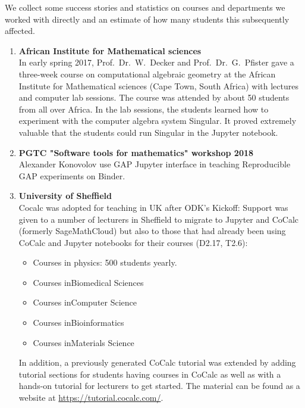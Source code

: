 We collect some success stories and statistics on courses and
departments we worked with directly and an estimate of how many
students this subsequently affected.

\begin{enumerate}
\item \textbf{African Institute for Mathematical sciences}\\
  In early spring 2017, Prof.~Dr.~W.~Decker and Prof.~Dr.~G.~Pfister
  gave a three-week course on computational algebraic geometry at the
  African Institute for Mathematical sciences (Cape Town, South
  Africa) with lectures and computer lab sessions. The course was
  attended by about 50 students from all over Africa. In the lab
  sessions, the students learned how to experiment with the computer
  algebra system Singular. It proved extremely valuable that the
  students could run Singular in the Jupyter notebook.

\item \textbf{PGTC "Software tools for mathematics" workshop 2018}\\
  Alexander Konovolov use GAP Jupyter interface in teaching
  Reproducible GAP experiments on Binder.

\item \textbf{University of Sheffield}\\
  Cocalc was adopted for teaching in UK after ODK's Kickoff: Support
  was given to a number of lecturers in Sheffield to migrate to
  Jupyter and CoCalc (formerly SageMathCloud) but also to those that
  had already been using CoCalc and Jupyter notebooks for their
  courses (D2.17, T2.6):
  \begin{itemize}
  \item Courses in physics: 500 students yearly.
  \item Courses inBiomedical Sciences
  \item Courses inComputer Science
  \item Courses inBioinformatics
  \item Courses inMaterials Science
  \end{itemize}

  In addition, a previously generated CoCalc tutorial was extended by
  adding tutorial sections for students having courses in CoCalc as
  well as with a hands-on tutorial for lecturers to get started. The
  material can be found as a website at
  \url{https://tutorial.cocalc.com/}.


\end{enumerate}
